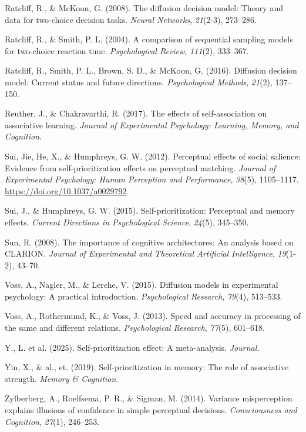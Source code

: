 \documentclass[
  english,
  man,floatsintext]{apa6}
\newlength{\cslhangindent}
\newenvironment{CSLReferences}[2] %
 {\begin{list}{}{%
  \setlength{\itemindent}{0pt}
  \setlength{\leftmargin}{0pt}
  \setlength{\parsep}{0pt}
  \ifodd #1
   \setlength{\leftmargin}{\cslhangindent}
   \setlength{\itemindent}{-1\cslhangindent}
  \fi
  \setlength{\itemsep}{#2\baselineskip}}}
 {\end{list}}
\begin{document}
\begin{CSLReferences}{1}{0}
Ratcliff, R., \& McKoon, G. (2008). The diffusion decision model: Theory and data for two-choice decision tasks. \emph{Neural Networks}, \emph{21}(2-3), 273--286.

Ratcliff, R., \& Smith, P. L. (2004). A comparison of sequential sampling models for two-choice reaction time. \emph{Psychological Review}, \emph{111}(2), 333--367.

Ratcliff, R., Smith, P. L., Brown, S. D., \& McKoon, G. (2016). Diffusion decision model: Current status and future directions. \emph{Psychological Methods}, \emph{21}(2), 137--150.

Reuther, J., \& Chakravarthi, R. (2017). The effects of self-association on associative learning. \emph{Journal of Experimental Psychology: Learning, Memory, and Cognition}.

Sui, Jie, He, X., \& Humphreys, G. W. (2012). Perceptual effects of social salience: Evidence from self-prioritization effects on perceptual matching. \emph{Journal of Experimental Psychology: Human Perception and Performance}, \emph{38}(5), 1105--1117. \url{https://doi.org/10.1037/a0029792}

Sui, J., \& Humphreys, G. W. (2015). Self-prioritization: Perceptual and memory effects. \emph{Current Directions in Psychological Science}, \emph{24}(5), 345--350.

Sun, R. (2008). The importance of cognitive architectures: An analysis based on CLARION. \emph{Journal of Experimental and Theoretical Artificial Intelligence}, \emph{19}(1-2), 43--70.

Voss, A., Nagler, M., \& Lerche, V. (2015). Diffusion models in experimental psychology: A practical introduction. \emph{Psychological Research}, \emph{79}(4), 513--533.

Voss, A., Rothermund, K., \& Voss, J. (2013). Speed and accuracy in processing of the same and different relations. \emph{Psychological Research}, \emph{77}(5), 601--618.

Y., L. et al. (2025). Self-prioritization effect: A meta-analysis. \emph{Journal}.

Yin, X., \& al., et. (2019). Self-prioritization in memory: The role of associative strength. \emph{Memory \& Cognition}.

Zylberberg, A., Roelfsema, P. R., \& Sigman, M. (2014). Variance misperception explains illusions of confidence in simple perceptual decisions. \emph{Consciousness and Cognition}, \emph{27}(1), 246--253.

\end{CSLReferences}
\end{document}
